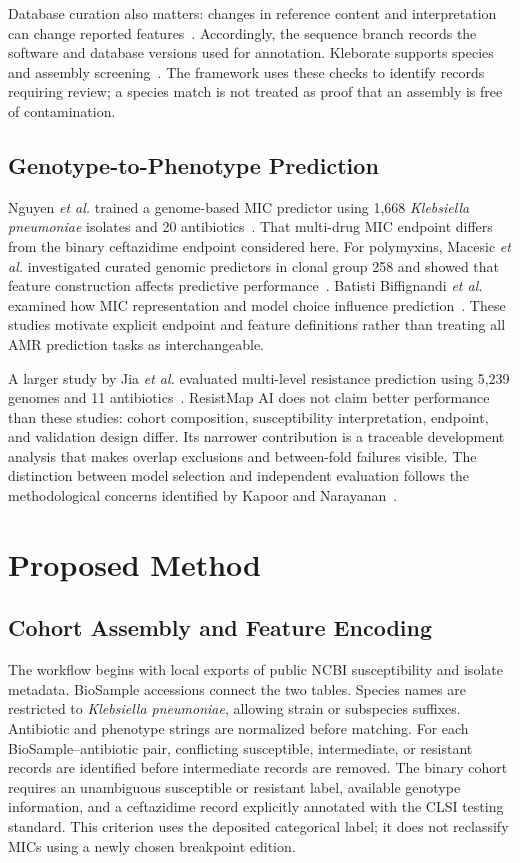 \documentclass[conference]{IEEEtran}
\newcommand{\kp}{\textit{Klebsiella pneumoniae}}
\begin{document}
Database curation also matters: changes in reference content and interpretation can change reported features~\cite{curation}. Accordingly, the sequence branch records the software and database versions used for annotation. Kleborate supports species and assembly screening~\cite{kleborate}. The framework uses these checks to identify records requiring review; a species match is not treated as proof that an assembly is free of contamination.

\subsection{Genotype-to-Phenotype Prediction}
Nguyen \textit{et al.} trained a genome-based MIC predictor using 1,668 \kp{} isolates and 20 antibiotics~\cite{nguyen}. That multi-drug MIC endpoint differs from the binary ceftazidime endpoint considered here. For polymyxins, Macesic \textit{et al.} investigated curated genomic predictors in clonal group 258 and showed that feature construction affects predictive performance~\cite{macesic}. Batisti Biffignandi \textit{et al.} examined how MIC representation and model choice influence prediction~\cite{mic}. These studies motivate explicit endpoint and feature definitions rather than treating all AMR prediction tasks as interchangeable.

A larger study by Jia \textit{et al.} evaluated multi-level resistance prediction using 5,239 genomes and 11 antibiotics~\cite{jia}. ResistMap AI does not claim better performance than these studies: cohort composition, susceptibility interpretation, endpoint, and validation design differ. Its narrower contribution is a traceable development analysis that makes overlap exclusions and between-fold failures visible. The distinction between model selection and independent evaluation follows the methodological concerns identified by Kapoor and Narayanan~\cite{leakage}.

\section{Proposed Method}
\subsection{Cohort Assembly and Feature Encoding}
The workflow begins with local exports of public NCBI susceptibility and isolate metadata. BioSample accessions connect the two tables. Species names are restricted to \kp{}, allowing strain or subspecies suffixes. Antibiotic and phenotype strings are normalized before matching. For each BioSample--antibiotic pair, conflicting susceptible, intermediate, or resistant records are identified before intermediate records are removed. The binary cohort requires an unambiguous susceptible or resistant label, available genotype information, and a ceftazidime record explicitly annotated with the CLSI testing standard. This criterion uses the deposited categorical label; it does not reclassify MICs using a newly chosen breakpoint edition.
\end{document}
